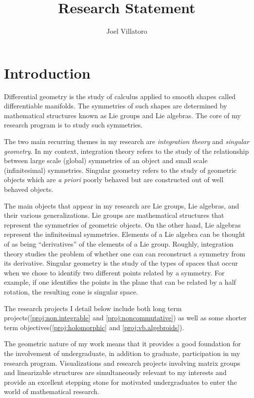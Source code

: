 \documentclass[11pt, letterpaper]{article}
\title{Research Statement}
\author{Joel Villatoro}
\date{}
\begin{document}
\maketitle
\section{Introduction}
Differential geometry is the study of calculus applied to smooth shapes called differentiable manifolds. The symmetries of such shapes are determined by mathematical structures known as Lie groups and Lie algebras. The core of my research program is to study such symmetries.

The two main recurring themes in my research are \emph{integration theory} and \emph{singular geometry}. 
In my context, integration theory refers to the study of the relationship between large scale (global) symmetries of an object and small scale (infinitesimal) symmetries. 
Singular geometry refers to the study of geometric objects which are \emph{a priori} poorly behaved but are constructed out of well behaved objects.

The main objects that appear in my research are Lie groups, Lie algebras, and their various generalizations. Lie groups are mathematical structures that represent the symmetries of geometric objects. On the other hand, Lie algebras represent the infinitesimal symmetries. Elements of a Lie algebra can be thought of as being ``derivatives'' of the elements of a Lie group. Roughly, integration theory studies the problem of whether one can can reconstruct a symmetry from its derivative. Singular geometry is the study of the types of spaces that occur when we chose to identify two different points related by a symmetry. For example, if one identifies the points in the plane that can be related by a half rotation, the resulting cone is singular space. 

The research projects I detail below include both long term projects(\ref{proj:non.integrable} and \ref{proj:noncommutative}) as well as some shorter term objectives(\ref{proj:holomorphic} and \ref{proj:vb.algebroids}).

The geometric nature of my work means that it provides a good foundation for the involvement of undergraduate, in addition to graduate, participation in my research program. 
Visualizations and research projects involving matrix groups and linearizable structures are simultaneously relevant to my interests and provide an excellent stepping stone for motivated undergraduates to enter the world of mathematical research.
\end{document}
